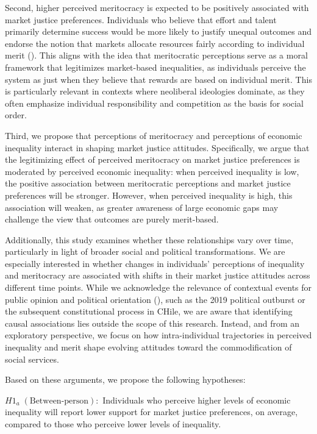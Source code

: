 \documentclass[
  12pt,
]{article}
\begin{document}
Second, higher perceived meritocracy is expected to be positively
associated with market justice preferences. Individuals who believe that
effort and talent primarily determine success would be more likely to
justify unequal outcomes and endorse the notion that markets allocate
resources fairly according to individual merit
().
This aligns with the idea that meritocratic perceptions serve as a moral
framework that legitimizes market-based inequalities, as individuals
perceive the system as just when they believe that rewards are based on
individual merit. This is particularly relevant in contexts where
neoliberal ideologies dominate, as they often emphasize individual
responsibility and competition as the basis for social order.

Third, we propose that perceptions of meritocracy and perceptions of
economic inequality interact in shaping market justice attitudes.
Specifically, we argue that the legitimizing effect of perceived
meritocracy on market justice preferences is moderated by perceived
economic inequality: when perceived inequality is low, the positive
association between meritocratic perceptions and market justice
preferences will be stronger. However, when perceived inequality is
high, this association will weaken, as greater awareness of large
economic gaps may challenge the view that outcomes are purely
merit-based.

Additionally, this study examines whether these relationships vary over
time, particularly in light of broader social and political
transformations. We are especially interested in whether changes in
individuals' perceptions of inequality and meritocracy are associated
with shifts in their market justice attitudes across different time
points. While we acknowledge the relevance of contextual events for
public opinion and political orientation
(), such as the 2019 political outburst or the subsequent
constitutional process in CHile, we are aware that identifying causal
associations lies outside the scope of this research. Instead, and from
an exploratory perspective, we focus on how intra-individual
trajectories in perceived inequality and merit shape evolving attitudes
toward the commodification of social services.

Based on these arguments, we propose the following hypotheses:

\(H1_{a} \; (\text{Between-person}):\) Individuals who perceive higher
levels of economic inequality will report lower support for market
justice preferences, on average, compared to those who perceive lower
levels of inequality.
\end{document}
